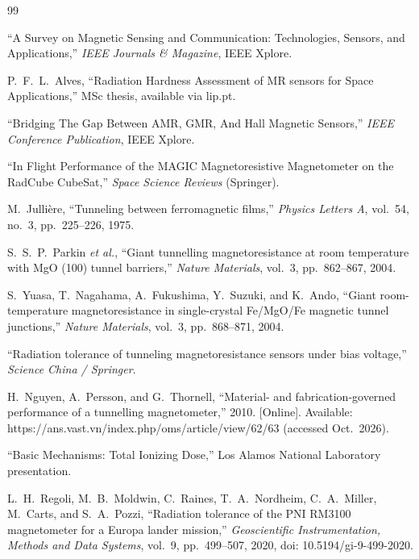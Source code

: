 \documentclass[12pt,a4paper]{article}
\begin{document}
\begin{thebibliography}{99}

``A Survey on Magnetic Sensing and Communication: Technologies, Sensors, and Applications,'' \emph{IEEE Journals \& Magazine}, IEEE Xplore.

P.\ F.\ L.\ Alves, ``Radiation Hardness Assessment of MR sensors for Space Applications,'' MSc thesis, available via lip.pt.

``Bridging The Gap Between AMR, GMR, And Hall Magnetic Sensors,'' \emph{IEEE Conference Publication}, IEEE Xplore.

``In Flight Performance of the MAGIC Magnetoresistive Magnetometer on the RadCube CubeSat,'' \emph{Space Science Reviews} (Springer).

M.\ Julli\`ere, ``Tunneling between ferromagnetic films,'' \emph{Physics Letters A}, vol.~54, no.~3, pp.~225--226, 1975.

S.\ S.\ P.\ Parkin \emph{et al.}, ``Giant tunnelling magnetoresistance at room temperature with MgO (100) tunnel barriers,'' \emph{Nature Materials}, vol.~3, pp.~862--867, 2004.

S.\ Yuasa, T.\ Nagahama, A.\ Fukushima, Y.\ Suzuki, and K.\ Ando, ``Giant room-temperature magnetoresistance in single-crystal Fe/MgO/Fe magnetic tunnel junctions,'' \emph{Nature Materials}, vol.~3, pp.~868--871, 2004.

``Radiation tolerance of tunneling magnetoresistance sensors under bias voltage,'' \emph{Science China / Springer}.

H.\ Nguyen, A.\ Persson, and G.\ Thornell, ``Material- and fabrication-governed performance of a tunnelling magnetometer,'' 2010. [Online]. Available: https://ans.vast.vn/index.php/oms/article/view/62/63 (accessed Oct.\ 2026).

``Basic Mechanisms: Total Ionizing Dose,'' Los Alamos National Laboratory presentation.

L.\ H.\ Regoli, M.\ B.\ Moldwin, C.\ Raines, T.\ A.\ Nordheim, C.\ A.\ Miller, M.\ Carts, and S.\ A.\ Pozzi, ``Radiation tolerance of the PNI RM3100 magnetometer for a Europa lander mission,'' \emph{Geoscientific Instrumentation, Methods and Data Systems}, vol.~9, pp.~499--507, 2020, doi: 10.5194/gi-9-499-2020.


\end{thebibliography}
\end{document}
